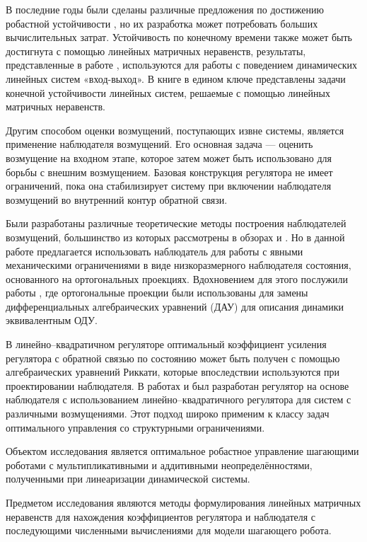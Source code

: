 В последние годы были сделаны различные предложения по достижению робастной устойчивости \cite{LMI7, LMI8}, но их разработка может потребовать больших вычислительных затрат.
Устойчивость по конечному времени также может быть достигнута с помощью линейных матричных неравенств, результаты, представленные в работе \cite{LMI6}, используются для работы с поведением динамических линейных систем «вход-выход». В книге \cite{Amato2011} в едином ключе представлены задачи конечной устойчивости линейных систем, решаемые с помощью линейных матричных неравенств.

Другим способом оценки возмущений, поступающих извне системы, является применение наблюдателя возмущений. Его основная задача --- оценить возмущение на входном этапе, которое затем может быть использовано для борьбы с внешним возмущением. Базовая конструкция регулятора не имеет ограничений, пока она стабилизирует систему при включении наблюдателя возмущений во внутренний контур обратной связи.

Были разработаны различные теоретические методы построения наблюдателей возмущений, большинство из которых рассмотрены в обзорах \cite{ObserverITMO} и \cite{Disturb_obs}. Но в данной работе предлагается использовать наблюдатель для работы с явными механическими ограничениями в виде низкоразмерного наблюдателя состояния, основанного на ортогональных проекциях. Вдохновением для этого послужили работы \cite{SAVIN2021, Righetti2011}, где ортогональные проекции были использованы для замены дифференциальных алгебраических уравнений (ДАУ) для описания динамики эквивалентным ОДУ. 

В линейно--квадратичном регуляторе оптимальный коэффициент усиления регулятора с обратной связью по состоянию может быть получен с помощью алгебраических уравнений Риккати, которые впоследствии используются при проектировании наблюдателя. В работах \cite{LQR1} и \cite{LQR2} был разработан регулятор на основе наблюдателя с использованием линейно--квадратичного регулятора для систем с различными возмущениями. Этот подход широко применим к классу задач оптимального управления со структурными ограничениями. 

{\objectsubject} 

Объектом исследования является оптимальное робастное управление шагающими роботами с мультипликативными и аддитивными неопределённостями, полученными при линеаризации динамической системы.

Предметом исследования являются методы формулирования линейных матричных неравенств для нахождения коэффициентов регулятора и наблюдателя с последующими численными вычислениями для модели шагающего робота.

